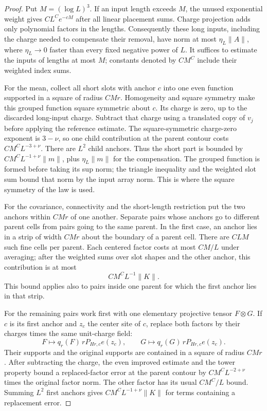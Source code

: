 \begin{proof}
Put $M=(\log L)^3$.  If an input length exceeds $M$, the unused exponential
weight gives $C L^C e^{-cM}$ after all linear placement sums.  Charge
projection adds only polynomial factors in the lengths.  Consequently these
long inputs, including the charge needed to compensate their removal, have
norm at most $\eta_L\|A\|$, where $\eta_L\to0$ faster than every fixed
negative power of $L$.  It suffices to estimate the inputs of lengths at
most $M$; constants denoted by $C M^C$ include their weighted index sums.

For the mean, collect all short slots with anchor $c$ into one even
function supported in a square of radius $C M r$.  Homogeneity and square
symmetry make this grouped function square symmetric about $c$.  Its charge
is zero, up to the discarded long-input charge.  Subtract that charge using
a translated copy of $v_j$ before applying the reference estimate.  The
square-symmetric charge-zero exponent is $3-\nu$, so one child contribution
at the parent contour costs $C M^C L^{-3+\nu}$.  There are $L^2$ child
anchors.  Thus the short part is bounded by
$C M^C L^{-1+\nu}\|m\|$, plus $\eta_L\|m\|$ for the compensation.
The grouped function is formed before taking its sup norm; the triangle
inequality and the weighted slot sum bound that norm by the input array
norm.  This is where the square symmetry of the law is used.

For the covariance, connectivity and the short-length restriction put the
two anchors within $C M r$ of one another.  Separate pairs whose anchors go
to different parent cells from pairs going to the same parent.  In the first
case, an anchor lies in a strip of width $C M r$ about the boundary of a
parent cell.  There are $C L M$ such fine cells per parent.  Each centered
factor costs at most $C M/L$ under averaging; after the weighted sums over
slot shapes and the other anchor, this contribution is at most
\begin{equation}\label{lin:strip}
 C M^C L^{-1}\|K\|.
\end{equation}
This bound applies also to pairs inside one parent for which the first anchor
lies in that strip.

For the remaining pairs work first with one elementary projective tensor
$F\otimes G$.  If $c$ is its first anchor and $z_c$ the center site of $c$,
replace both factors by their charges times the same unit-charge field:
\[
 F\longmapsto q_r(F)\,rP_{Hr,c}e(z_c),\qquad
 G\longmapsto q_r(G)\,rP_{Hr,c}e(z_c).
\]
Their supports and the original supports are contained in a square of
radius $C M r$.  After subtracting the charge, the even improved estimate
and the tower property bound a replaced-factor error at the parent contour
by $C M^C L^{-2+\nu}$ times the original factor norm.  The other factor has
its usual $C M^C/L$ bound.  Summing $L^2$ first anchors gives
$C M^C L^{-1+\nu}\|K\|$ for terms containing a replacement error.


\end{proof}
